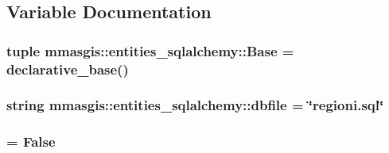 \subsection{Variable Documentation}
\hypertarget{namespacemmasgis_1_1entities__sqlalchemy_aaa0dddfdd8822aab88b25896958b1804}{
\subsubsection[{Base}]{\setlength{\rightskip}{0pt plus 5cm}tuple {\bf mmasgis::entities\_\-sqlalchemy::Base} = declarative\_\-base()}}
\label{namespacemmasgis_1_1entities__sqlalchemy_aaa0dddfdd8822aab88b25896958b1804}
\hypertarget{namespacemmasgis_1_1entities__sqlalchemy_a2e2321c93ccd6ea1ea8f9873cd075fd5}{
\subsubsection[{dbfile}]{\setlength{\rightskip}{0pt plus 5cm}string {\bf mmasgis::entities\_\-sqlalchemy::dbfile} = \char`\"{}regioni.sql\char`\"{}}}
\label{namespacemmasgis_1_1entities__sqlalchemy_a2e2321c93ccd6ea1ea8f9873cd075fd5}
\hypertarget{namespacemmasgis_1_1entities__sqlalchemy_a2af262318ac2c46e862e055590d06498}{
\subsubsection[{echo}]{ = False}}
\label{namespacemmasgis_1_1entities__sqlalchemy_a2af262318ac2c46e862e055590d06498}
